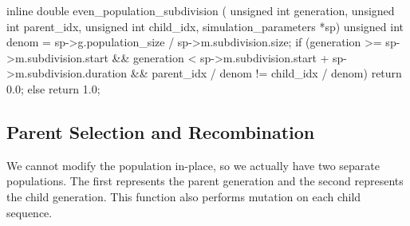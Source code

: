 \documentclass{article}
\begin{document}
\begin{ccode}
inline double even_population_subdivision (
    unsigned int generation, unsigned int parent_idx,
    unsigned int child_idx, simulation_parameters *sp) {
  unsigned int denom = sp->g.population_size / sp->m.subdivision.size;
  if (generation >= sp->m.subdivision.start &&
      generation < sp->m.subdivision.start + sp->m.subdivision.duration &&
      parent_idx / denom != child_idx / denom)
    return 0.0;
  else
    return 1.0;
}
\end{ccode}

    \subsection{Parent Selection and Recombination}

      We cannot modify the population in-place, so we actually have two separate
      populations. The first represents the parent generation and the second
      represents the child generation. This function also performs mutation on
      each child sequence.
\end{document}
